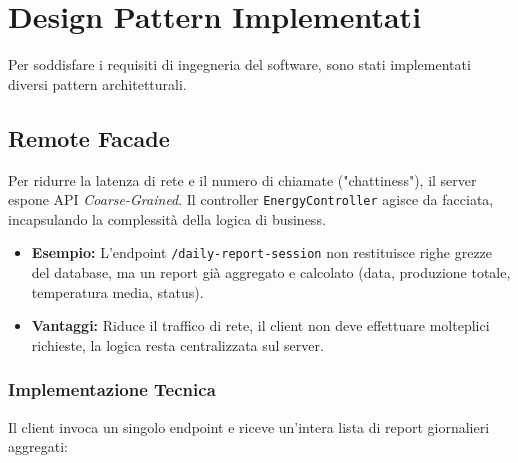 \documentclass[a4paper,12pt]{report}
\begin{document}
\chapter{Design Pattern Implementati}

Per soddisfare i requisiti di ingegneria del software, sono stati implementati diversi pattern architetturali.

\section{Remote Facade}
Per ridurre la latenza di rete e il numero di chiamate ("chattiness"), il server espone API \textit{Coarse-Grained}. Il controller \texttt{EnergyController} agisce da facciata, incapsulando la complessità della logica di business.
\begin{itemize}
    \item \textbf{Esempio:} L'endpoint \texttt{/daily-report-session} non restituisce righe grezze del database, ma un report già aggregato e calcolato (data, produzione totale, temperatura media, status).
    \item \textbf{Vantaggi:} Riduce il traffico di rete, il client non deve effettuare molteplici richieste, la logica resta centralizzata sul server.
\end{itemize}

\subsection{Implementazione Tecnica}
Il client invoca un singolo endpoint e riceve un'intera lista di report giornalieri aggregati:
\end{document}
